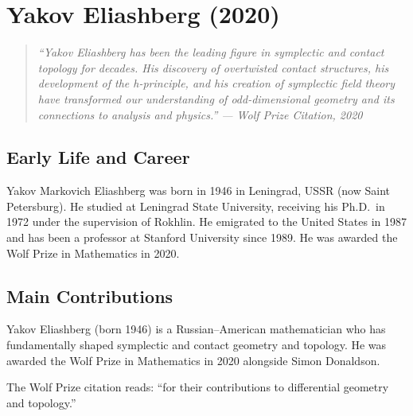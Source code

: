 \providecommand{\Cont}{\operatorname{Cont}}
\providecommand{\Symp}{\operatorname{Symp}}
\providecommand{\Ham}{\operatorname{Ham}}
\providecommand{\Leg}{\operatorname{Leg}}
\let\C\relax
\newcommand{\C}{\mathbb{C}}

\chapter{Yakov Eliashberg (2020)}

\begin{quote}
\it ``Yakov Eliashberg has been the leading figure in symplectic and contact topology for decades. His discovery of overtwisted contact structures, his development of the h-principle, and his creation of symplectic field theory have transformed our understanding of odd-dimensional geometry and its connections to analysis and physics.'' --- Wolf Prize Citation, 2020
\end{quote}

\section{Early Life and Career}

Yakov Markovich Eliashberg was born in 1946 in Leningrad, USSR (now Saint Petersburg). He studied at Leningrad State University, receiving his Ph.D.\ in 1972 under the supervision of Rokhlin. He emigrated to the United States in 1987 and has been a professor at Stanford University since 1989. He was awarded the Wolf Prize in Mathematics in 2020.

\section{Main Contributions}

Yakov Eliashberg (born 1946) is a Russian--American mathematician who has fundamentally shaped symplectic and contact geometry and topology. He was awarded the Wolf Prize in Mathematics in 2020 alongside Simon Donaldson.

The Wolf Prize citation reads: ``for their contributions to differential geometry and topology.''

